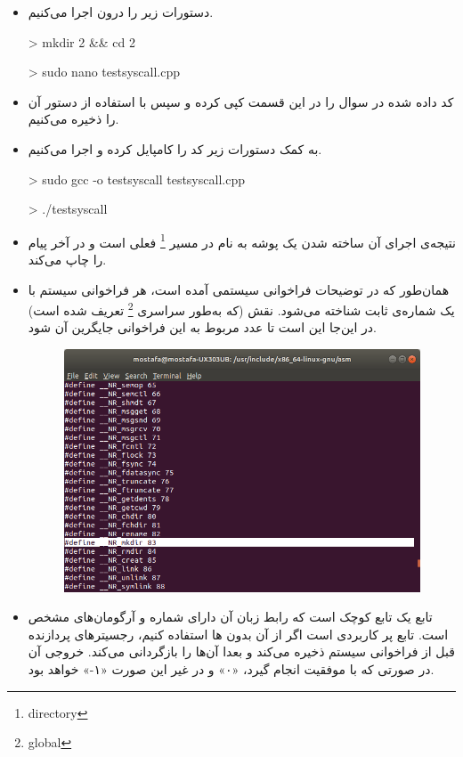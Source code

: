 \begin{itemize}
	\item 
	دستورات زیر را درون  اجرا می‌کنیم.
	
	\begin{code}
		> mkdir 2 \&\& cd 2
		
		> sudo nano testsyscall.cpp
		
		
	\end{code}

	\item کد داده شده در سوال را در این قسمت کپی کرده و سپس با استفاده از دستور  آن را ذخیره می‌کنیم.
	
	\item به کمک دستورات زیر کد را کامپایل کرده و اجرا می‌کنیم.
	
	\begin{code}
		> sudo gcc -o testsyscall testsyscall.cpp 
		
		> ./testsyscall
	\end{code}

	\item نتیجه‌ی اجرای آن ساخته شدن یک پوشه به نام  در مسیر   \footnote{directory} فعلی است و در آخر پیام  را چاپ می‌کند.
	
	\item 
	همان‌طور که در توضیحات فراخوانی سیستمی آمده است، هر فراخوانی سیستم با یک شماره‌ی ثابت شناخته می‌شود. نقش  (که به‌طور سراسری \footnote{global} تعریف شده است) در این‌جا این است تا عدد مربوط به این فراخوانی جایگرین آن شود.
	
	\begin{figure}[h!]
		\centering
		\includegraphics[scale=.4]{img/2.png}
	\end{figure}
	
	\item تابع  یک تابع کوچک است که رابط زبان  آن دارای شماره و آرگومان‌های مشخص است. تابع پر کاربردی است اگر از آن بدون ها استفاده کنیم، رجسیترهای پردازنده قبل از فراخوانی سیستم ذخیره می‌کند و بعدا آن‌ها را بازگردانی می‌کند. خروجی آن در صورتی که با موفقیت انجام گیرد، «۰» و در غیر این صورت «۱-» خواهد بود.
\end{itemize}

